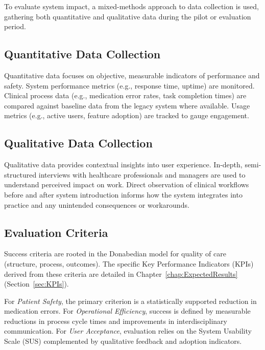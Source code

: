 To evaluate system impact, a mixed-methods approach to data collection is used, gathering both quantitative and qualitative data during the pilot or evaluation period.

\subsection{Quantitative Data Collection}
Quantitative data focuses on objective, measurable indicators of performance and safety. System performance metrics (e.g., response time, uptime) are monitored. Clinical process data (e.g., medication error rates, task completion times) are compared against baseline data from the legacy system where available. Usage metrics (e.g., active users, feature adoption) are tracked to gauge engagement.

\subsection{Qualitative Data Collection}
Qualitative data provides contextual insights into user experience. In-depth, semi-structured interviews with healthcare professionals and managers are used to understand perceived impact on work. Direct observation of clinical workflows before and after system introduction informs how the system integrates into practice and any unintended consequences or workarounds.

\subsection{Evaluation Criteria}
Success criteria are rooted in the Donabedian model for quality of care (structure, process, outcomes). The specific Key Performance Indicators (KPIs) derived from these criteria are detailed in Chapter~\ref{chap:ExpectedResults} (Section~\ref{sec:KPIs}).

For \textit{Patient Safety}, the primary criterion is a statistically supported reduction in medication errors. For \textit{Operational Efficiency}, success is defined by measurable reductions in process cycle times and improvements in interdisciplinary communication. For \textit{User Acceptance}, evaluation relies on the System Usability Scale (SUS) complemented by qualitative feedback and adoption indicators.

